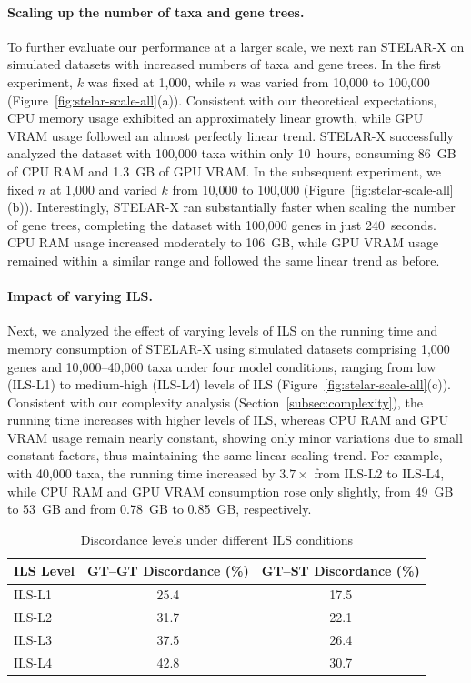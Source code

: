 \documentclass[10pt,a4paper]{article}
\begin{document}
\paragraph{Scaling up the number of taxa and gene trees.} To further evaluate our performance at a larger scale, we next ran STELAR-X on simulated datasets with increased numbers of taxa and gene trees. In the first experiment, $k$ was fixed at 1{,}000, while $n$ was varied from 10{,}000 to 100{,}000 (Figure~\ref{fig:stelar-scale-all}(a)). Consistent with our theoretical expectations, CPU memory usage exhibited an approximately linear growth, while GPU VRAM usage followed an almost perfectly linear trend. STELAR-X successfully analyzed the dataset with 100{,}000 taxa within only 10~hours, consuming 86~GB of CPU RAM and 1.3~GB of GPU VRAM. In the subsequent experiment, we fixed $n$ at 1{,}000 and varied $k$ from 10{,}000 to 100{,}000 (Figure~\ref{fig:stelar-scale-all}(b)). Interestingly, STELAR-X ran substantially faster when scaling the number of gene trees, completing the dataset with 100{,}000 genes in just 240~seconds. CPU RAM usage increased moderately to 106~GB, while GPU VRAM usage remained within a similar range and followed the same linear trend as before.

\paragraph{Impact of varying ILS.} Next, we analyzed the effect of varying levels of ILS on the running time and memory consumption of STELAR-X using simulated datasets comprising 1{,}000 genes and 10{,}000–40{,}000 taxa under four model conditions, ranging from low (ILS-L1) to medium-high (ILS-L4) levels of ILS (Figure~\ref{fig:stelar-scale-all}(c)). Consistent with our complexity analysis (Section~\ref{subsec:complexity}), the running time increases with higher levels of ILS, whereas CPU RAM and GPU VRAM usage remain nearly constant, showing only minor variations due to small constant factors, thus maintaining the same linear scaling trend. For example, with 40{,}000 taxa, the running time increased by $3.7\times$ from ILS-L2 to ILS-L4, while CPU RAM and GPU VRAM consumption rose only slightly, from 49~GB to 53~GB and from 0.78~GB to 0.85~GB, respectively.

\begin{table}[h]
\caption{Discordance levels under different ILS conditions}
\label{tab:ils-levels}
\centering
\setlength{\tabcolsep}{8pt}
\begin{tabular}{l c c}
\toprule
\textbf{ILS Level} & \textbf{GT--GT Discordance (\%)} & \textbf{GT--ST Discordance (\%)} \\
\midrule
ILS-L1 & 25.4 & 17.5 \\
ILS-L2 & 31.7 & 22.1 \\
ILS-L3 & 37.5 & 26.4 \\
ILS-L4 & 42.8 & 30.7 \\
\bottomrule
\end{tabular}
\end{table}
\end{document}
